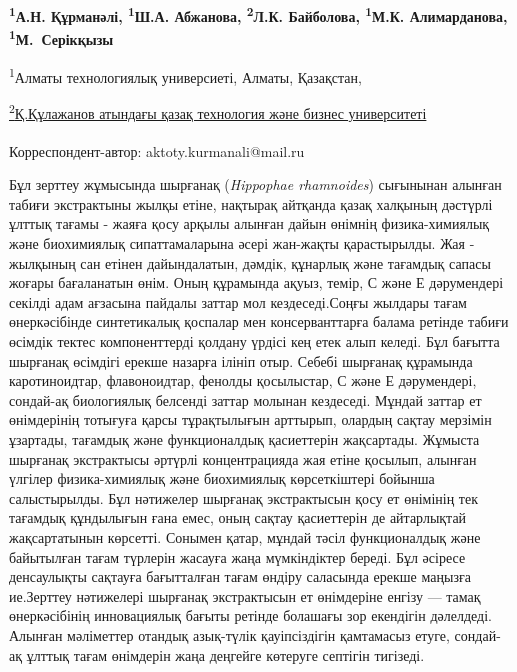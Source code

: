 
\begin{articleheader}

{\bfseries
\textsuperscript{1}А.Н. Құрманәлі\textsuperscript{\envelope},
\textsuperscript{1}Ш.А. Абжанова,
\textsuperscript{2}Л.К. Байболова,
\textsuperscript{1}М.К. Алимарданова,
\textsuperscript{1}М.~Серікқызы
}
\end{articleheader}

\begin{affiliation}
\textsuperscript{1}Алматы технологиялық универсиеті, Алматы, Қазақстан,

\href{https://www.kaztbu.edu.kz/}{\textsuperscript{2}Қ.Құлажанов атындағы қазақ технология және бизнес университеті}

\raggedright \textsuperscript{\envelope }Корреспондент-автор: aktoty.kurmanali@mail.ru
\end{affiliation}

Бұл зерттеу жұмысында шырғанақ (\emph{Hippophae rhamnoides}) сығынынан
алынған табиғи экстрактыны жылқы етіне, нақтырақ айтқанда қазақ халқының
дәстүрлі ұлттық тағамы - жаяға қосу арқылы алынған дайын өнімнің
физика-химиялық және биохимиялық сипаттамаларына әсері жан-жақты
қарастырылды. Жая - жылқының сан етінен дайындалатын, дәмдік, құнарлық
және тағамдық сапасы жоғары бағаланатын өнім. Оның құрамында ақуыз,
темір, С және Е дәрумендері секілді адам ағзасына пайдалы заттар мол
кездеседі.Соңғы жылдары тағам өнеркәсібінде синтетикалық қоспалар мен
консерванттарға балама ретінде табиғи өсімдік тектес компоненттерді
қолдану үрдісі кең етек алып келеді. Бұл бағытта шырғанақ өсімдігі
ерекше назарға ілініп отыр. Себебі шырғанақ құрамында каротиноидтар,
флавоноидтар, фенолды қосылыстар, С және Е дәрумендері, сондай-ақ
биологиялық белсенді заттар молынан кездеседі. Мұндай заттар ет
өнімдерінің тотығуға қарсы тұрақтылығын арттырып, олардың сақтау
мерзімін ұзартады, тағамдық және функционалдық қасиеттерін жақсартады.
Жұмыста шырғанақ экстрактысы әртүрлі концентрацияда жая етіне қосылып,
алынған үлгілер физика-химиялық және биохимиялық көрсеткіштері бойынша
салыстырылды. Бұл нәтижелер шырғанақ экстрактысын қосу ет өнімінің тек
тағамдық құндылығын ғана емес, оның сақтау қасиеттерін де айтарлықтай
жақсартатынын көрсетті. Сонымен қатар, мұндай тәсіл функционалдық және
байытылған тағам түрлерін жасауға жаңа мүмкіндіктер береді. Бұл әсіресе
денсаулықты сақтауға бағытталған тағам өндіру саласында ерекше маңызға
ие.Зерттеу нәтижелері шырғанақ экстрактысын ет өнімдеріне енгізу ---
тамақ өнеркәсібінің инновациялық бағыты ретінде болашағы зор екендігін
дәлелдеді. Алынған мәліметтер отандық азық-түлік қауіпсіздігін
қамтамасыз етуге, сондай-ақ ұлттық тағам өнімдерін жаңа деңгейге
көтеруге септігін тигізеді.


